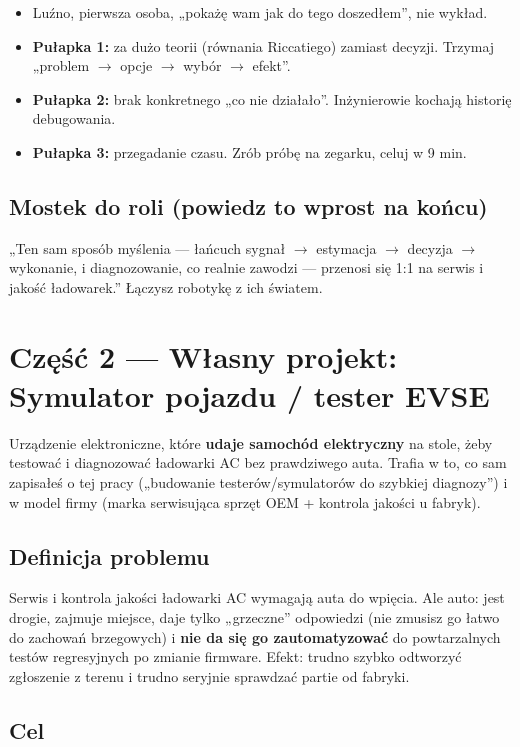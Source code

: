 \documentclass[11pt]{article}
\newcommand{\ra}{$\rightarrow$}
\begin{document}
\begin{itemize}
  \item Luźno, pierwsza osoba, „pokażę wam jak do tego doszedłem”, nie wykład.
  \item \textbf{Pułapka 1:} za dużo teorii (równania Riccatiego) zamiast decyzji. Trzymaj „problem \ra{} opcje \ra{} wybór \ra{} efekt”.
  \item \textbf{Pułapka 2:} brak konkretnego „co nie działało”. Inżynierowie kochają historię debugowania.
  \item \textbf{Pułapka 3:} przegadanie czasu. Zrób próbę na zegarku, celuj w 9 min.
\end{itemize}

\subsection{Mostek do roli (powiedz to wprost na końcu)}

„Ten sam sposób myślenia --- łańcuch sygnał \ra{} estymacja \ra{} decyzja \ra{} wykonanie, i diagnozowanie, co realnie zawodzi --- przenosi się 1:1 na serwis i jakość ładowarek.” Łączysz robotykę z ich światem.

\section{Część 2 --- Własny projekt: Symulator pojazdu / tester EVSE}

Urządzenie elektroniczne, które \textbf{udaje samochód elektryczny} na stole, żeby testować i diagnozować ładowarki AC bez prawdziwego auta. Trafia w to, co sam zapisałeś o tej pracy („budowanie testerów/symulatorów do szybkiej diagnozy”) i w model firmy (marka serwisująca sprzęt OEM + kontrola jakości u fabryk).

\subsection{Definicja problemu}

Serwis i kontrola jakości ładowarki AC wymagają auta do wpięcia. Ale auto: jest drogie, zajmuje miejsce, daje tylko „grzeczne” odpowiedzi (nie zmusisz go łatwo do zachowań brzegowych) i \textbf{nie da się go zautomatyzować} do powtarzalnych testów regresyjnych po zmianie firmware. Efekt: trudno szybko odtworzyć zgłoszenie z terenu i trudno seryjnie sprawdzać partie od fabryki.

\subsection{Cel}
\end{document}
